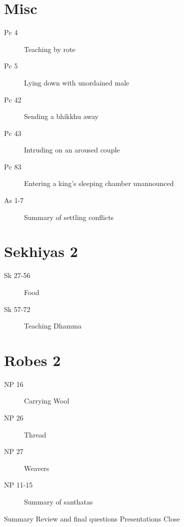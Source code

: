 \documentclass[11pt,oneside]{memoir}
\begin{document}
\begin{multicols}{2}

\section{Misc}

\begin{description}
\item[Pc 4] Teaching by rote
\item[Pc 5 \orig] Lying down with unordained male%
\item[Pc 42] Sending a bhikkhu away
\item[Pc 43 \orig] Intruding on an aroused couple%
\item[Pc 83 \orig] Entering a king's sleeping chamber unannounced%
\item[As 1-7] Summary of settling conflicts
\end{description}

\columnbreak

\section{Sekhiyas 2}

\begin{description}
\item[Sk 27-56] Food
\item[Sk 57-72] Teaching Dhamma
\end{description}

\section{Robes 2}

\begin{description}
\item[NP 16 \orig] Carrying Wool%
\item[NP 26] Thread
\item[NP 27] Weavers
\item[NP 11-15] Summary of santhatas
\end{description}

\end{multicols}

\vspace*{\baselineskip}

\numberedtopicsfalse
\centeringsectiontrue

{\centering
{}

 Summary\quad
{} Review and final questions\quad
{} Presentations\quad
{} Close

\par}
\end{document}

